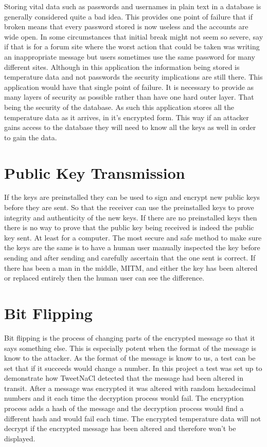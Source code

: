 Storing vital data such as passwords and usernames in plain text in a database is generally considered quite a bad idea. This provides one point of failure that if broken means that every password stored is now useless and the accounts are wide open. In some circumstances that initial break might not seem so severe, say if that is for a forum site where the worst action that could be taken was writing an inappropriate message but users sometimes use the same password for many different sites. Although in this application the information being stored is temperature data and not passwords the security implications are still there. This application would have that single point of failure. It is necessary to provide as many layers of security as possible rather than have one hard outer layer. That being the security of the database. As such this application stores all the temperature data as it arrives, in it's encrypted form. This way if an attacker gains access to the database they will need to know all the keys as well in order to gain the data.

\section{Public Key Transmission}

If the keys are preinstalled they can be used to sign and encrypt new public keys before they are sent. So that the receiver can use the preinstalled keys to prove integrity and authenticity of the new keys. If there are no preinstalled keys then there is no way to prove that the public key being received is indeed the public key sent. At least for a computer. The most secure and safe method to make sure the keys are the same is to have a human user manually inspected the key before sending and after sending and carefully ascertain that the one sent is correct. If there has been a man in the middle, MITM, and either the key has been altered or replaced entirely then the human user can see the difference. 

\section{Bit Flipping}

Bit flipping is the process of changing parts of the encrypted message so that it says something else. This is especially potent when the format of the message is know to the attacker. As the format of the message is know to us, a test can be set that if it succeeds would change a number. In this project a test was set up to demonstrate how TweetNaCl detected that the message had been altered in transit. After a message was encrypted it was altered with random hexadecimal numbers and it each time the decryption process would fail. The encryption process adds a hash of the message and the decryption process would find a different hash and would fail each time. The encrypted temperature data will not decrypt if the encrypted message has been altered and therefore won't be displayed.


